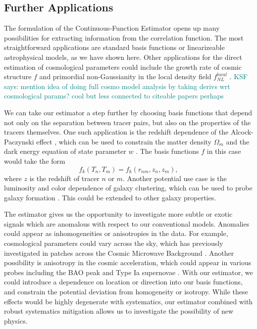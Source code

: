 \documentclass[modern]{aastex62}
\newcommand{\est}{the Continuous-Function Estimator\xspace}
\newcommand{\KSF}[1]{\textcolor{teal}{KSF says: #1}}
\begin{document}
\subsection{Further Applications}

The formulation of \est opens up many possibilities for extracting information from the correlation function.
The most straightforward applications are standard basis functions or linearizeable astrophysical models, as we have shown here.
Other applications for the direct estimation of cosmological parameters could include the growth rate of cosmic structure $f$ \citep{Satpathy2016, Reid2018} and primordial non-Gaussianity in the local density field $f^{local}_{NL}$ \citep{Karagiannis2014}.
\KSF{mention idea of doing full cosmo model analysis by taking derivs wrt cosmological params? cool but less connected to citeable papers perhaps}

We can take our estimator a step further by choosing basis functions that depend not only on the separation between tracer pairs, but also on the properties of the tracers themselves.
One such application is the redshift dependence of the Alcock-Paczynski effect \cite{AlcockPaczynski1979}, which can be used to constrain the matter density $\Omega_m$ and the dark energy equation of state parameter $w$ \citep{Li2016}.
The basis functions $f$ in this case would take the form
\begin{equation}
    f_k(T_n, T_m) = f_k(r_{nm}, z_n, z_m),
\end{equation}
where $z$ is the redshift of tracer $n$ or $m$.
Another potential use case is the luminosity and color dependence of galaxy clustering, which can be used to probe galaxy formation \citep{Zehavi2011}.
This could be extended to other galaxy properties.

The estimator gives us the opportunity to investigate more subtle or exotic signals which are anomalous with respect to our conventional models.
Anomalies could appear as inhomogeneities or anisotropies in the data.
For example, cosmological parameters could vary across the sky, which has previously investigated in patches across the Cosmic Microwave Background \citep{MukherjeeWandelt2018}.
Another possibility is anisotropy in the cosmic acceleration, which could appear in various probes including the BAO peak \citep{Faltenbacher2012} and Type Ia supernovae \citep{Colin2019}.
With our estimator, we could introduce a dependence on location or direction into our basis functions, and constrain the potential deviation from homogeneity or isotropy.
While these effects would be highly degenerate with systematics, our estimator combined with robust systematics mitigation allows us to investigate the possibility of new physics.
\end{document}
